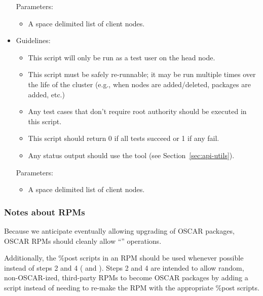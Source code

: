 \begin{itemize}
  Parameters:
  
  \begin{itemize}
  \item A space delimited list of client nodes.
  \end{itemize}

\item {}

  Guidelines:
  \begin{itemize}
  \item This script will only be run as a test user on the head node.
  \item This script must be safely re-runnable; it may be run multiple
    times over the life of the cluster (e.g., when nodes are
    added/deleted, packages are added, etc.)
  \item Any test cases that don't require root authority should be executed
    in this script.
  \item This script should return 0 if all tests succeed or 1 if any
    fail.
  \item Any status output should use the  tool
    (see Section~\ref{sec:api-utils}).
  \end{itemize}

  Parameters:
  
  \begin{itemize}
  \item A space delimited list of client nodes.
  \end{itemize}

\end{itemize}


\subsubsection{Notes about RPMs}

Because we anticipate eventually allowing upgrading of OSCAR packages,
OSCAR RPMs should cleanly allow ``'' operations.

Additionally, the \%post scripts in an RPM should be used whenever
possible instead of steps 2 and 4
( and
).  Steps 2 and 4 are intended
to allow random, non-OSCAR-ized, third-party RPMs to become OSCAR
packages by adding a script instead of needing to re-make the RPM with
the appropriate \%post scripts.

